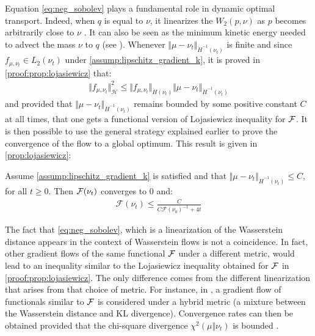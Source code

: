 Equation \cref{eq:neg_sobolev} plays a fundamental role in dynamic optimal transport. Indeed, when $q$ is equal to $\nu$, it linearizes the $W_2(p,\nu)$ as $p$ becomes arbitrarily close to $\nu$ \cite{Villani:2009,Otto:2000,Peyre:2011}. It can also be seen as the minimum kinetic energy needed to advect the mass $\nu$ to $q$ (see \cite{mroueh2018regularized}). Whenever $\Vert \mu - \nu_t \Vert_{\dot{H}^{-1}(\nu_t)} $ is finite and since $f_{\mu,\nu_t}\in L_2(\nu_t)$ under \cref{assump:lipschitz_gradient_k}, it is proved in \cref{proof:prop:lojasiewicz} that:
\begin{align}\label{eq:inequality_neg_sobolev}
	\Vert f_{\mu,\nu_t} \Vert^2_{\mathcal{H}} \leq \Vert f_{\mu,\nu_t} \Vert_{\dot{H}(\nu_t)} \Vert  \mu -\nu_t\Vert_{\dot{H}^{-1}(\nu_t)}  
\end{align}
and provided that $\Vert \mu - \nu_t \Vert_{\dot{H}^{-1}(\nu_t)} $ remains bounded by some positive constant $C$ at all times, that one gets a functional version of Lojasiewicz inequality for ${{\mathcal F}}$. 
It is then possible to use the general strategy explained earlier to prove the convergence of the flow to a global optimum. This result is given in \cref{prop:lojasiewicz}:
\begin{proposition}\label{prop:lojasiewicz}
	Assume \cref{assump:lipschitz_gradient_k} is satisfied and that $\Vert \mu - \nu_t \Vert_{\dot{H}^{-1}(\nu_t)} \leq C$, for all $t\geq 0$. Then ${{\mathcal F}}(\nu_t)$ converges to $0$ and:
	\begin{align}
	\mathcal{F}(\nu_t)\leq \frac{C}{C\mathcal{F}(\nu_0)^{-1} + 4t}
	\end{align}
\end{proposition}
The fact that \cref{eq:neg_sobolev}, which is a linearization of the Wasserstein distance appears in the context of Wasserstein flows is not a coincidence. In fact, other gradient flows of the same functional ${{\mathcal F}}$ under a different metric, would lead to an inequality similar to the Lojasiewicz inequality obtained for ${{\mathcal F}}$ in \cref{proof:prop:lojasiewicz}.  %
The only difference comes from the different linearization that arises from that choice of metric. For instance, in \cite{Rotskoff:2019}, a gradient flow of functionals similar to ${{\mathcal F}}$ is considered under a hybrid metric (a mixture between the Wasserstein distance and KL divergence). Convergence rates can then be obtained provided that the chi-square divergence $\chi^2(\mu\Vert \nu_t)$ is bounded%
.

